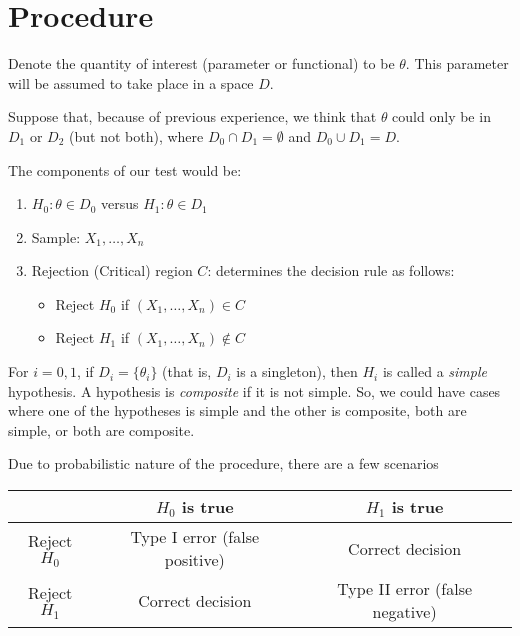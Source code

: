 \documentclass[
  openany]{book}
\providecommand{\tightlist}{%
  \setlength{\itemsep}{0pt}\setlength{\parskip}{0pt}}
\theoremstyle{definition}
\theoremstyle{definition}
\theoremstyle{definition}
\theoremstyle{definition}
\theoremstyle{remark}
\begin{document}
\section{Procedure}\label{procedure}

Denote the quantity of interest (parameter or functional) to be \(\theta\).
This parameter will be assumed to take place in a space \(D\).

Suppose that, because of previous experience, we think that \(\theta\) could only be in \(D_1\) or \(D_2\)
(but not both), where \(D_0 \cap D_1 = \emptyset\) and \(D_0 \cup D_1 = D\).

The components of our test would be:

\begin{enumerate}
\def\labelenumi{\arabic{enumi}.}
\tightlist
\item
  \(H_0 : \theta \in D_0\) versus \(H_1: \theta \in D_1\)
\item
  Sample: \(X_1, \dots, X_n\)
\item
  Rejection (Critical) region \(C\): determines the decision rule as follows:

  \begin{itemize}
  \tightlist
  \item
    Reject \(H_0\) if \((X_1, \dots, X_n) \in C\)
  \item
    Reject \(H_1\) if \((X_1, \dots, X_n) \not\in C\)
  \end{itemize}
\end{enumerate}

For \(i=0,1\), if \(D_i = \{ \theta_i \}\) (that is, \(D_i\) is a singleton), then \(H_i\) is called a \emph{simple} hypothesis.
A hypothesis is \emph{composite} if it is not simple.
So, we could have cases where one of the hypotheses is simple and the other is composite,
both are simple, or both are composite.

Due to probabilistic nature of the procedure, there are a few scenarios

\begin{longtable}[]{@{}ccc@{}}
\toprule\noalign{}
& \(H_0\) is true & \(H_1\) is true \\
\midrule\noalign{}
\endhead
\bottomrule\noalign{}
\endlastfoot
Reject \(H_0\) & Type I error (false positive) & Correct decision \\
Reject \(H_1\) & Correct decision & Type II error (false negative) \\
\end{longtable}
\end{document}
